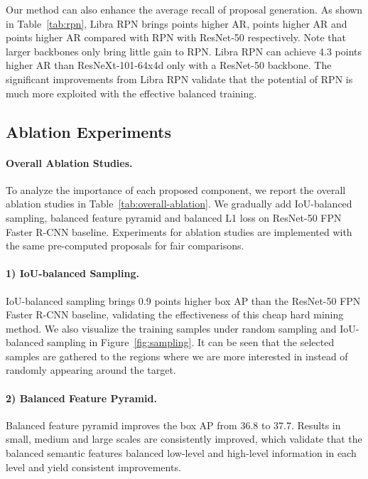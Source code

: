 \documentclass[10pt,twocolumn,letterpaper]{article}
\begin{document}
Our method can also enhance the average recall of proposal generation.
As shown in Table~\ref{tab:rpn}, Libra RPN brings  points higher AR,  points higher AR and  points higher AR compared with RPN with ResNet-50 respectively.
Note that larger backbones only bring little gain to RPN.
Libra RPN can achieve 4.3 points higher AR than ResNeXt-101-64x4d only with a ResNet-50 backbone.
The significant improvements from Libra RPN validate that the potential of RPN is much more exploited with the effective balanced training.

\subsection{Ablation Experiments}
\paragraph{Overall Ablation Studies.}
To analyze the importance of each proposed component, we report the overall ablation studies in Table~\ref{tab:overall-ablation}.
We gradually add IoU-balanced sampling, balanced feature pyramid and balanced L1 loss on ResNet-50 FPN Faster R-CNN baseline.
Experiments for ablation studies are implemented with the same pre-computed proposals for fair comparisons.

\vspace{-12pt}
\paragraph{1) IoU-balanced Sampling.}
IoU-balanced sampling brings 0.9 points higher box AP than the ResNet-50 FPN Faster R-CNN baseline, validating the effectiveness of this cheap hard mining method.
We also visualize the training samples under random sampling and IoU-balanced sampling in Figure~\ref{fig:sampling}.
It can be seen that the selected samples are gathered to the regions where we are more interested in instead of randomly appearing around the target.

\vspace{-12pt}
\paragraph{2) Balanced Feature Pyramid.}
Balanced feature pyramid improves the box AP from 36.8 to 37.7.
Results in small, medium and large scales are consistently improved, which validate that the balanced semantic features balanced low-level and high-level information in each level and yield consistent improvements.
\end{document}
